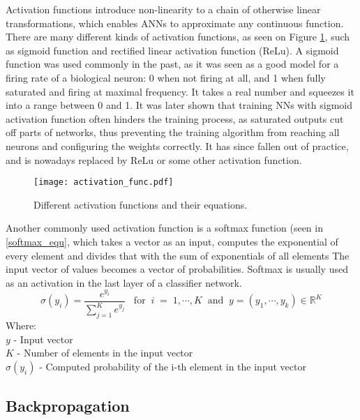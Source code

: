 Activation functions introduce non-linearity to a chain of otherwise linear transformations, which enables ANNs to approximate any continuous function\cite{geron}.
There are many different kinds of activation functions, as seen on Figure \ref{activation_functions}, such as sigmoid function and rectified linear activation function (ReLu).
A sigmoid function was used commonly in the past, as it was seen as a good model for a firing rate of a biological neuron: 0 when not firing at all, and 1 when fully saturated and firing at maximal frequency\cite{cs231n}.
It takes a real number and squeezes it into a range between 0 and 1.
It was later shown that training NNs with sigmoid activation function often hinders the training process, as saturated outputs cut off parts of networks, thus preventing the training algorithm from reaching all neurons and configuring the weights correctly\cite{cs231n}.
It has since fallen out of practice, and is nowadays replaced by ReLu or some other activation function.

\begin{figure}[ht!]
        \centering
        \texttt{[image: activation\_func.pdf]} 
        \caption{Different activation functions and their equations.}
        \label{activation_functions}
\end{figure}


Another commonly used activation function is a softmax function (seen in \ref{softmax_equ}, which takes a vector as an input, computes the exponential of every element and divides that with the sum of exponentials of all elements\cite{geron}
The input vector of values becomes a vector of probabilities.
Softmax is usually used as an activation in the last layer of a classifier network. 
\begin{equation}\label{softmax_equ}
    \sigma(y_i) = \frac{e^{y_i}}{\sum_{j=1}^{K}e^{y_j}}\;\;\;\text{for}\;\;i\;=\;1,\cdots,K\;\;\text{and}\;\;y=(y_1,\cdots,y_k)\in\mathbb{R}^K
\end{equation}
Where:\\
$y$ - Input vector\\
$K$ - Number of elements in the input vector\\
$\sigma(y_i)$ - Computed probability of the i-th element in the input vector

\subsection{ Backpropagation}


